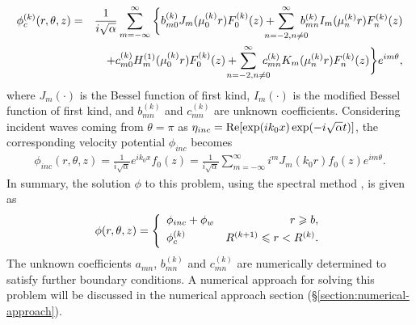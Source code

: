 \documentclass{jfm}
\begin{document}
\begin{eqnarray}
\displaystyle \phi_{c}^{(k)}(r,\theta,z)&=&\frac{1}{i\sqrt{\alpha}}\sum_{m=-\infty}^{\infty}\bigg\{b^{(k)}_{m0}J_m(\mu^{(k)}_0r)F^{(k)}_0(z)+\hspace{-4mm}\sum_{n=-2,n\ne 0}^\infty \hspace{-3mm}b^{(k)}_{mn}I_m(\mu^{(k)}_nr)F^{(k)}_n(z)\nonumber\\
&&+c^{(k)}_{m0}H_m^{(1)}(\mu^{(k)}_0r)F^{(k)}_0(z)+\hspace{-4mm}\sum_{n=-2,n\ne 0}^\infty \hspace{-3mm}c^{(k)}_{mn}K_m(\mu^{(k)}_nr)F^{(k)}_n(z)\bigg\}e^{im\theta},
\label{eq:07}
\end{eqnarray}
where $J_m(\cdot)$ is the Bessel function of first kind, $I_m(\cdot)$ is the modified Bessel function of first kind, and $b_{mn}^{(k)}$ and $c_{mn}^{(k)}$ are unknown coefficients.
% 
Considering incident waves coming from $\theta=\pi$ as $\eta_{inc}={\rm Re}[\exp(ik_0x)\exp(-i\sqrt{\alpha}t)]$, the corresponding velocity potential $\phi_{inc}$ becomes
\begin{eqnarray}
\displaystyle \phi_{inc}(r,\theta,z)=\frac{1}{i\sqrt{\alpha}}e^{ik_0x}f_0(z)=\frac{1}{i\sqrt{\alpha}}\sum_{m=-\infty}^{\infty}i^mJ_m(k_0r)f_0(z)e^{im\theta}.
\label{eq:08}
\end{eqnarray}
In summary, the solution $\phi$ to this problem, using the spectral method  \cite[e.g.][]{Peter2004}, is given as
\begin{eqnarray}
\phi(r,\theta,z)=\left\{\begin{array}{lr}
\vspace{1mm}
\displaystyle \phi_{inc}+\phi_w&r\ge b,\\
\vspace{1mm}
\displaystyle \phi_{c}^{(k)}&R^{(k+1)}\le r < R^{(k)}.\\
\end{array}\right.
\label{eq:09}
\end{eqnarray}
The unknown coefficients $a_{mn}$, $b_{mn}^{(k)}$ and $c_{mn}^{(k)}$ are numerically determined to satisfy further boundary conditions. A numerical approach for solving this problem will be discussed in the numerical approach section (\S\ref{section:numerical-approach}).

\end{document}
